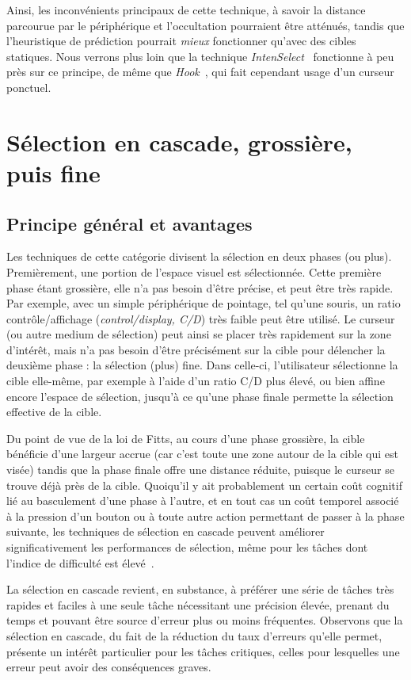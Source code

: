 	Ainsi, les inconvénients principaux de cette technique, à savoir la distance parcourue par le périphérique et l'occultation pourraient être atténués, tandis que l'heuristique de prédiction pourrait \emph{mieux} fonctionner qu'avec des cibles statiques. Nous verrons plus loin que la technique \emph{IntenSelect}~\cite{de2005intenselect} fonctionne à peu près sur ce principe, de même que \emph{Hook}~\cite{ortega2013hook}, qui fait cependant usage d'un curseur ponctuel.

\section{Sélection en cascade, grossière, puis fine}
	\subsection{Principe général et avantages}
	Les techniques de cette catégorie divisent la sélection en deux phases (ou plus). Premièrement, une portion de l'espace visuel est sélectionnée. Cette première phase étant grossière, elle n'a pas besoin d'être précise, et peut être très rapide. Par exemple, avec un simple périphérique de pointage, tel qu'une souris, un ratio contrôle/affichage (\emph{control/display, C/D}) très faible peut être utilisé. Le curseur (ou autre medium de sélection) peut ainsi se placer très rapidement sur la zone d'intérêt, mais n'a pas besoin d'être précisément sur la cible pour délencher la deuxième phase : la sélection (plus) fine. Dans celle-ci, l'utilisateur sélectionne la cible elle-même, par exemple à l'aide d'un ratio C/D plus élevé, ou bien affine encore l'espace de sélection, jusqu'à ce qu'une phase finale permette la sélection effective de la cible.
	 
	Du point de vue de la loi de Fitts, au cours d'une phase grossière, la cible bénéficie d'une largeur accrue (car c'est toute une zone autour de la cible qui est visée) tandis que la phase finale offre une distance réduite, puisque le curseur se trouve déjà près de la cible. Quoiqu'il y ait probablement un certain \og coût cognitif \fg{} lié au basculement d'une phase à l'autre, et en tout cas un coût temporel associé à la pression d'un bouton ou à toute autre action permettant de passer à la phase suivante, les techniques de sélection en cascade peuvent améliorer significativement les performances de sélection, même pour les tâches dont l'indice de difficulté est élevé~\cite{kopper2011rapid}.
	
	La sélection en cascade revient, en substance, à préférer une série de tâches très rapides et faciles à une seule tâche nécessitant une précision élevée, prenant du temps et pouvant être source d'erreur plus ou moins fréquentes. Observons que la sélection en cascade, du fait de la réduction du taux d'erreurs qu'elle permet, présente un intérêt particulier pour les tâches critiques, celles pour lesquelles une erreur peut avoir des conséquences graves.
	
